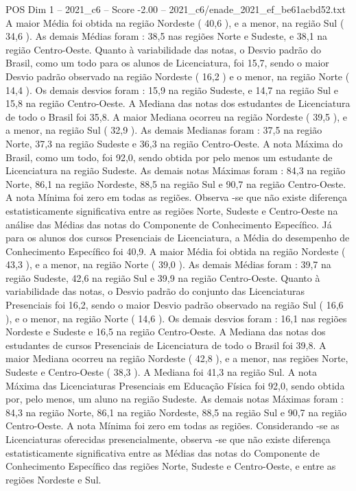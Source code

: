 \begin{textsample}{POS Dim 1 – 2021\_c6 – Score -2.00 – 2021\_c6/enade\_2021\_ef\_be61acbd52.txt}
A maior Média foi obtida na região Nordeste ( 40,6 ), e a menor, na região Sul ( 34,6 ).
As demais Médias foram : 38,5 nas regiões Norte e Sudeste, e 38,1 na região Centro-Oeste.
Quanto à variabilidade das notas, o Desvio padrão do Brasil, como um todo para os alunos de Licenciatura, foi 15,7, sendo o maior Desvio padrão observado na região Nordeste ( 16,2 ) e o menor, na região Norte ( 14,4 ).
Os demais desvios foram : 15,9 na região Sudeste, e 14,7 na região Sul e 15,8 na região Centro-Oeste.
A Mediana das notas dos estudantes de Licenciatura de todo o Brasil foi 35,8.
A maior Mediana ocorreu na região Nordeste ( 39,5 ), e a menor, na região Sul ( 32,9 ).
As demais Medianas foram : 37,5 na região Norte, 37,3 na região Sudeste e 36,3 na região Centro-Oeste.
A nota Máxima do Brasil, como um todo, foi 92,0, sendo obtida por pelo menos um estudante de Licenciatura na região Sudeste.
As demais notas Máximas foram : 84,3 na região Norte, 86,1 na região Nordeste, 88,5 na região Sul e 90,7 na região Centro-Oeste.
A nota Mínima foi zero em todas as regiões.
Observa -se que não existe diferença estatisticamente significativa entre as regiões Norte, Sudeste e Centro-Oeste na análise das Médias das notas do Componente de Conhecimento Específico.
Já para os alunos dos cursos Presenciais de Licenciatura, a Média do desempenho de Conhecimento Específico foi 40,9.
A maior Média foi obtida na região Nordeste ( 43,3 ), e a menor, na região Norte ( 39,0 ).
As demais Médias foram : 39,7 na região Sudeste, 42,6 na região Sul e 39,9 na região Centro-Oeste.
Quanto à variabilidade das notas, o Desvio padrão do conjunto das Licenciaturas Presenciais foi 16,2, sendo o maior Desvio padrão observado na região Sul ( 16,6 ), e o menor, na região Norte ( 14,6 ).
Os demais desvios foram : 16,1 nas regiões Nordeste e Sudeste e 16,5 na região Centro-Oeste.
A Mediana das notas dos estudantes de cursos Presenciais de Licenciatura de todo o Brasil foi 39,8.
A maior Mediana ocorreu na região Nordeste ( 42,8 ), e a menor, nas regiões Norte, Sudeste e Centro-Oeste ( 38,3 ).
A Mediana foi 41,3 na região Sul.
A nota Máxima das Licenciaturas Presenciais em Educação Física foi 92,0, sendo obtida por, pelo menos, um aluno na região Sudeste.
As demais notas Máximas foram : 84,3 na região Norte, 86,1 na região Nordeste, 88,5 na região Sul e 90,7 na região Centro-Oeste.
A nota Mínima foi zero em todas as regiões.
Considerando -se as Licenciaturas oferecidas presencialmente, observa -se que não existe diferença estatisticamente significativa entre as Médias das notas do Componente de Conhecimento Específico das regiões Norte, Sudeste e Centro-Oeste, e entre as regiões Nordeste e Sul.

\end{textsample}
